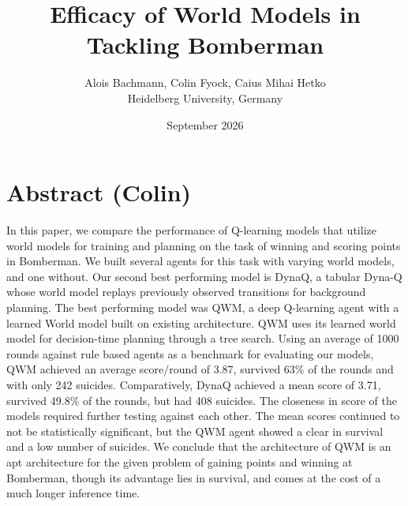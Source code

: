 \documentclass[article, 10pt]{IEEEtran}
\begin{document}
\title{Efficacy of World Models in Tackling Bomberman}
\author{Alois Bachmann, Colin Fyock, Caius Mihai Hetko \\
Heidelberg University, Germany
\date{September 2026}
}

\maketitle

\section{Abstract (Colin)}\label{sec:0_abstract}
In this paper, we compare the performance of Q-learning models that utilize world models for training and planning on the task of winning and scoring points in Bomberman. We built several agents for this task with varying world models, and one without. Our second best performing model is DynaQ, a tabular Dyna-Q whose world model replays previously observed transitions for background planning. The best performing model was QWM, a deep Q-learning agent with a learned World model built on existing architecture\cite{dong2026qwm}. QWM uses its learned world model for decision-time planning through a tree search. Using an average of 1000 rounds against rule based agents as a benchmark for evaluating our models, QWM achieved an average score/round of 3.87, survived 63\% of the rounds and with only 242 suicides. Comparatively, DynaQ achieved a mean score of 3.71, survived 49.8\% of the rounds, but had 408 suicides. The closeness in score of the models required further testing against each other. The mean scores continued to not be statistically significant, but the QWM agent showed a clear in survival and a low number of suicides. We conclude that the architecture of QWM is an apt architecture for the given problem of gaining points and winning at Bomberman, though its advantage lies in survival, and comes at the cost of a much longer inference time.

\end{document}
